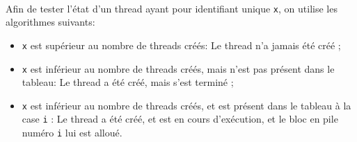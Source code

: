 \documentclass{article}
\begin{document}
			~\par{Afin de tester l'état d'un thread ayant pour identifiant unique \texttt{x}, on utilise les algorithmes suivants: }
				\begin{itemize}
					\item{\texttt{x} est supérieur au nombre de threads créés: } Le thread n'a jamais été créé ;
					\item{\texttt{x} est inférieur au nombre de threads créés, mais n'est pas présent dans le tableau: } Le thread a été créé, mais s'est terminé ;
					\item{\texttt{x} est inférieur au nombre de threads créés, et est présent dans le tableau à la case \texttt{i} : Le thread a été créé, et est en cours d'exécution, et le bloc en pile numéro \texttt{i} lui est alloué.}
				\end{itemize}
\end{document}
